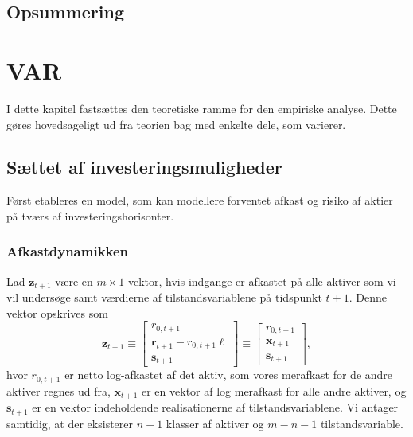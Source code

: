 \documentclass[
  a4paper,
  oneside]{memoir}
\begin{document}
\hypertarget{opsummering}{%
\section{Opsummering}\label{opsummering}}

\hypertarget{var}{%
\chapter{VAR}\label{var}}

I dette kapitel fastsættes den teoretiske ramme for den empiriske analyse. Dette gøres hovedsageligt ud fra teorien bag \citep{Userguide2004} med enkelte dele, som varierer.

\section{Sættet af investeringsmuligheder}

Først etableres en model, som kan modellere forventet afkast og risiko af aktier på tværs af investeringshorisonter.

\subsection{Afkastdynamikken}

Lad \(\bm{z}_{t+1}\) være en \(m\times 1\) vektor, hvis indgange er afkastet på alle aktiver som vi vil undersøge samt værdierne af tilstandsvariablene på tidspunkt \(t+1\). Denne vektor opskrives som
\begin{equation}
        \bm{z}_{t+1}\equiv
        \begin{bmatrix}
        r_{0,t+1}\\
        \bm{r}_{t+1}-r_{0,t+1}\bm{\ell}\\
        \bm{s}_{t+1}
        \end{bmatrix}\equiv
        \begin{bmatrix}
        r_{0,t+1}\\
        \bm{x}_{t+1}\\
        \bm{s}_{t+1}
        \end{bmatrix},
    \end{equation}
hvor \(r_{0,t+1}\) er netto log-afkastet af det aktiv, som vores merafkast for de andre aktiver regnes ud fra, \(\bm{x}_{t+1}\) er en vektor af log merafkast for alle andre aktiver, og \(\bm{s}_{t+1}\) er en vektor indeholdende realisationerne af tilstandsvariablene. Vi antager samtidig, at der eksisterer \(n+1\) klasser af aktiver og \(m-n-1\) tilstandsvariable.
\end{document}
